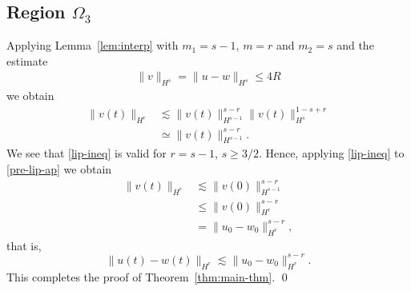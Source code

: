 \documentclass[12pt,reqno]{amsart}
\numberwithin{equation}{section}  %
\numberwithin{figure}{section}
\begin{document}
\subsection{Region $\Omega_{3}$} 
\label{ssec:case-2}
%
%
Applying Lemma~\ref{lem:interp} with $m_{1} = s-1$, $m =r$ and $m_{2} = s$ and
the estimate
%
%
\begin{equation*}
\begin{split}
  \|v\|_{H^{s}} = \|u - w \|_{H^{s}} \le 4R
\end{split}
\end{equation*}
%
%
we obtain
%
%
\begin{equation}
  \label{pre-lip-ap}
\begin{split}
  \| v(t) \|_{H^{r}} & \lesssim \| v(t) \|_{H^{s-1}}^{s-r} \|v(t) \|_{H^{s}}^{1-s+r}
  \\
  & \simeq \| v(t) \|_{H^{s-1}}^{s-r}.
\end{split}
\end{equation}
%
%
We see that \eqref{lip-ineq} is valid for  $r = s-1$, $s \ge 3/2$. Hence,
applying \eqref{lip-ineq} to \eqref{pre-lip-ap} we obtain 
%
%
\begin{equation*}
\begin{split}
  \| v(t) \|_{H^{r}} & \lesssim \|v(0) \|_{H^{s-1}}^{s-r}
   \\
   & \le \|v(0) \|_{H^{r}}^{s-r} 
  \\
  & = \|u_{0} - w_{0}\|_{H^{r}}^{s-r},
\end{split}
\end{equation*}
%
that is,
\begin{equation*}
  \| u(t) - w(t) \|_{H^{r}} \lesssim  \|u_{0} - w_{0}\|_{H^{r}}^{s-r}.
\end{equation*}
%
This completes the proof of Theorem~\ref{thm:main-thm}. \qed
%
%
%
%
%
%
%
%
%
%
\end{document}
